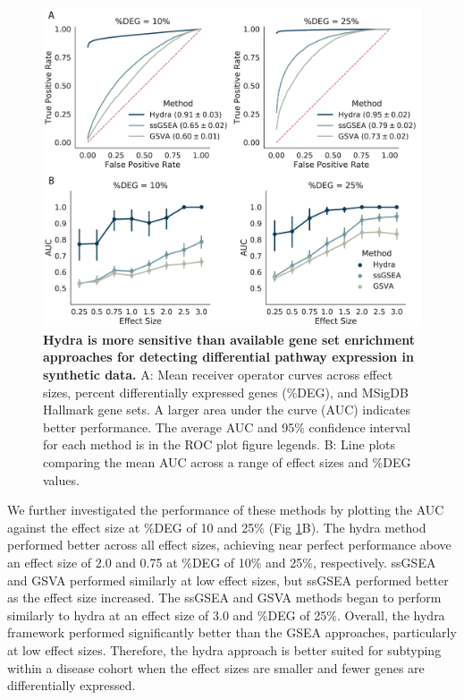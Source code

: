 \documentclass[10pt,letterpaper]{article}
\begin{document}
\begin{figure}[!h]
	\includegraphics[width=\textwidth]{img/ROC-PLOT-2x}
	\caption{{\bf Hydra is more sensitive than available gene set enrichment approaches for detecting differential pathway expression in synthetic data.}
		A: Mean receiver operator curves across effect sizes, percent differentially expressed genes (\%DEG), and MSigDB Hallmark gene sets. A larger area under the curve (AUC) indicates better performance. The average AUC and 95\% confidence interval for each method is in the ROC plot figure legends. B: Line plots comparing the mean AUC across a range of effect sizes and \%DEG values. 
		\label{rocplot}}
\end{figure}

We further investigated the performance of these methods by plotting the AUC against the effect size at \%DEG of 10 and 25\% (Fig \ref{rocplot}B). The hydra method performed better across all effect sizes, achieving near perfect performance above an effect size of 2.0 and 0.75 at \%DEG of 10\% and 25\%, respectively. ssGSEA and GSVA performed similarly at low effect sizes, but ssGSEA performed better as the effect size increased. The ssGSEA and GSVA methods began to perform similarly to hydra at an effect size of 3.0 and \%DEG of 25\%. Overall, the hydra framework performed significantly better than the GSEA approaches, particularly at low effect sizes. Therefore, the hydra approach is better suited for subtyping within a disease cohort when the effect sizes are smaller and fewer genes are differentially expressed.
\end{document}
